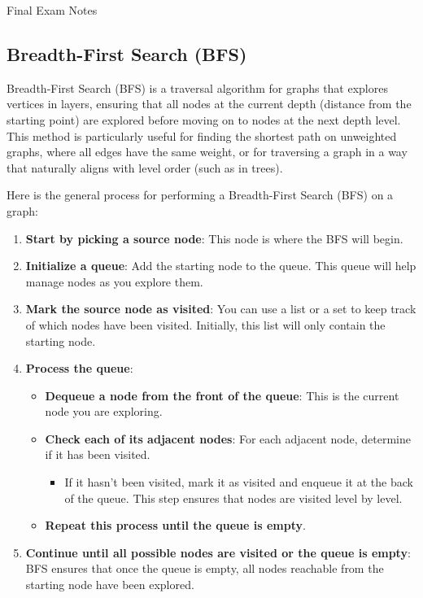 \begin{examnotes}{Final Exam Notes}
    \subsection*{Breadth-First Search (BFS)}

    Breadth-First Search (BFS) is a traversal algorithm for graphs that explores vertices in layers, ensuring that all nodes at the current depth (distance from the starting point) are explored before 
    moving on to nodes at the next depth level. This method is particularly useful for finding the shortest path on unweighted graphs, where all edges have the same weight, or for traversing a graph 
    in a way that naturally aligns with level order (such as in trees).

    \begin{highlight}
        Here is the general process for performing a Breadth-First Search (BFS) on a graph:

        \begin{enumerate}
            \item \textbf{Start by picking a source node}: This node is where the BFS will begin.
            \item \textbf{Initialize a queue}: Add the starting node to the queue. This queue will help manage nodes as you explore them.
            \item \textbf{Mark the source node as visited}: You can use a list or a set to keep track of which nodes have been visited. Initially, this list will only contain the starting node.
            \item \textbf{Process the queue}:
            \begin{itemize}
                \item \textbf{Dequeue a node from the front of the queue}: This is the current node you are exploring.
                \item \textbf{Check each of its adjacent nodes}: For each adjacent node, determine if it has been visited.
                \begin{itemize}
                    \item If it hasn't been visited, mark it as visited and enqueue it at the back of the queue. This step ensures that nodes are visited level by level.
                \end{itemize}
                \item \textbf{Repeat this process until the queue is empty}.
            \end{itemize}
            \item \textbf{Continue until all possible nodes are visited or the queue is empty}: BFS ensures that once the queue is empty, all nodes reachable from the starting node have been explored.
        \end{enumerate}
    \end{highlight}


\end{examnotes}
